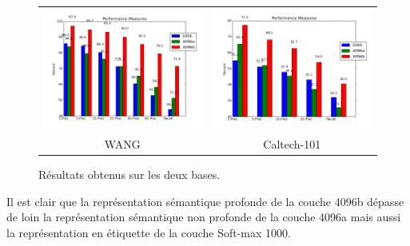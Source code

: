 \begin{figure}[H]
\centering
\begin{tabular}{cc}
\centering

\includegraphics[width=9cm]{Figures/results/res-wang1.png}
&
\includegraphics[width=9cm]{Figures/results/res-caltech1.png}\\
WANG & Caltech-101\\
\end{tabular}
\caption[comp7]{Résultats obtenus sur les deux bases.}
\end{figure}

	Il est clair que la représentation sémantique profonde de la couche 4096b dépasse de loin la représentation sémantique non profonde de la couche 4096a mais aussi la représentation en étiquette de la couche Soft-max 1000.



